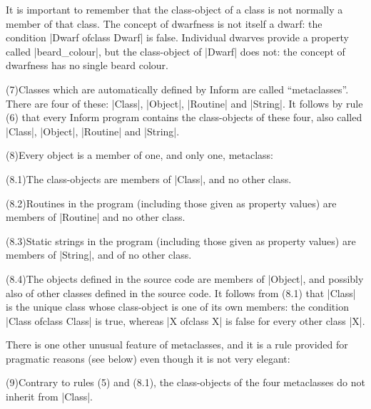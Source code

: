 It is important to remember that the class-object of a class is not normally
a member of that class.  The concept of dwarfness is not itself a dwarf:
the condition |Dwarf ofclass Dwarf| is false.  Individual dwarves provide
a property called |beard_colour|, but the class-object of |Dwarf| does not:
the concept of dwarfness has no single beard colour.
\medskip\noindent
\item{(7)}Classes which are automatically defined by Inform are called
``metaclasses''.  There are four of these: |Class|, |Object|, |Routine|
and |String|.
\medskip\noindent
It follows by rule (6) that every Inform program contains the class-objects
of these four, also called |Class|, |Object|, |Routine| and |String|.
\medskip\noindent
\item{(8)}Every object is a member of one, and only one, metaclass:
\item{(8.1)}The class-objects are members of |Class|, and no other class.
\item{(8.2)}Routines in the program (including those given as property
values) are members of |Routine| and no other class.
\item{(8.3)}Static strings in the program (including those given as property
values) are members of |String|, and of no other class.
\item{(8.4)}The objects defined in the source code are members of |Object|,
and possibly also of other classes defined in the source code.
\medskip\noindent
It follows from (8.1) that |Class| is the unique class whose class-object
is one of its own members: the condition |Class ofclass Class| is true,
whereas |X ofclass X| is false for every other class |X|.

There is one other unusual feature of metaclasses, and it is a rule provided
for pragmatic reasons (see below) even though it is not very elegant:
\medskip\noindent
\item{(9)}Contrary to rules (5) and (8.1), the class-objects of the four
metaclasses do not inherit from |Class|.

